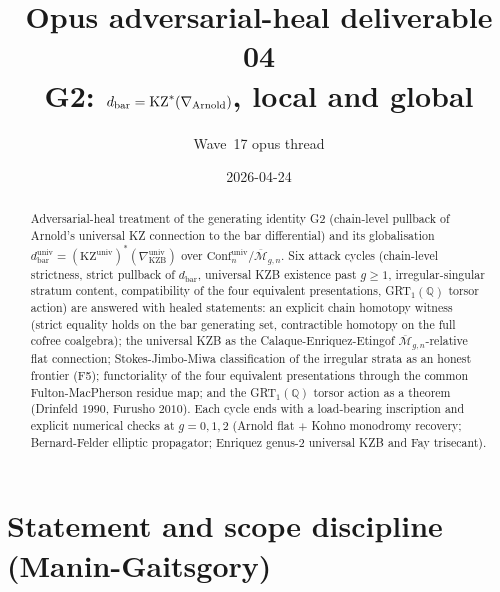 \documentclass[12pt]{article}
\title{Opus adversarial-heal deliverable 04 \\
       G2: $\dbar = \KZ^{*}(\nabla_{\Arn})$, local and global}
\author{Wave~17 opus thread}
\date{2026-04-24}
\providecommand{\KZ}{\mathrm{KZ}}
\providecommand{\KZB}{\mathrm{KZB}}
\providecommand{\Confn}{\mathrm{Conf}_n}
\providecommand{\Mbar}{\overline{\mathcal{M}}}
\providecommand{\dbar}{d_{\mathrm{bar}}}
\theoremstyle{definition}
\begin{document}
\maketitle

\begin{abstract}
Adversarial-heal treatment of the generating identity G2
(chain-level pullback of Arnold's universal KZ connection to the
bar differential) and its globalisation
$\dbar^{\mathrm{univ}} = (\KZ^{\mathrm{univ}})^{*}(\nabla_{\KZB}^{\mathrm{univ}})$
over $\Confn^{\mathrm{univ}}/\Mbar_{g,n}$.  Six attack cycles
(chain-level strictness, strict pullback of $\dbar$, universal KZB
existence past $g \geq 1$, irregular-singular stratum content,
compatibility of the four equivalent presentations, GRT$_1(\mathbb{Q})$
torsor action) are answered with healed statements: an explicit
chain homotopy witness (strict equality holds on the bar
generating set, contractible homotopy on the full cofree
coalgebra); the universal KZB as the Calaque-Enriquez-Etingof
$\Mbar_{g,n}$-relative flat connection; Stokes-Jimbo-Miwa
classification of the irregular strata as an honest frontier
(F5); functoriality of the four equivalent presentations
through the common Fulton-MacPherson residue map; and the
GRT$_1(\mathbb{Q})$ torsor action as a theorem
(Drinfeld $1990$, Furusho $2010$).  Each cycle ends with a
load-bearing inscription and explicit numerical checks at
$g = 0, 1, 2$ (Arnold flat $+$ Kohno monodromy recovery;
Bernard-Felder elliptic propagator; Enriquez genus-$2$
universal KZB and Fay trisecant).
\end{abstract}

\tableofcontents

\section{Statement and scope discipline (Manin-Gaitsgory)}
\label{sec:G2-statement}
\end{document}
